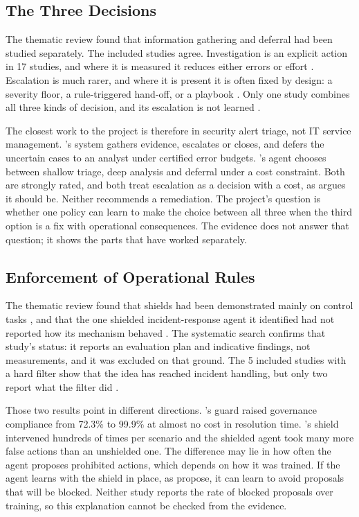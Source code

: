 \documentclass[pdflatex,sn-basic]{sn-jnl}
\begin{document}
\subsection{The Three Decisions}

The thematic review found that information gathering and deferral had been studied separately. The included studies agree. Investigation is an explicit action in 17 studies, and where it is measured it reduces either errors or effort \citep{wu2026,kovtun2026,ghanem2026,wang2023hrlhf}. Escalation is much rarer, and where it is present it is often fixed by design: a severity floor, a rule-triggered hand-off, or a playbook \citep{okafor2026,singh2026,koupaei2026}. Only one study combines all three kinds of decision, and its escalation is not learned \citep{okafor2026}.

The closest work to the project is therefore in security alert triage, not IT service management. \citeauthor{sahin2026}'s \citeyearpar{sahin2026} system gathers evidence, escalates or closes, and defers the uncertain cases to an analyst under certified error budgets. \citeauthor{kovtun2026}'s \citeyearpar{kovtun2026} agent chooses between shallow triage, deep analysis and deferral under a cost constraint. Both are strongly rated, and both treat escalation as a decision with a cost, as \citet{turan2026} argues it should be. Neither recommends a remediation. The project's question is whether one policy can learn to make the choice between all three when the third option is a fix with operational consequences. The evidence does not answer that question; it shows the parts that have worked separately.

\subsection{Enforcement of Operational Rules}

The thematic review found that shields had been demonstrated mainly on control tasks \citep{alshiekh2018,konighofer2025}, and that the one shielded incident-response agent it identified had not reported how its mechanism behaved \citep{alauthman2026}. The systematic search confirms that study's status: it reports an evaluation plan and indicative findings, not measurements, and it was excluded on that ground. The 5 included studies with a hard filter show that the idea has reached incident handling, but only two report what the filter did \citep{ravi2025,singh2026}.

Those two results point in different directions. \citeauthor{singh2026}'s \citeyearpar{singh2026} guard raised governance compliance from 72.3\% to 99.9\% at almost no cost in resolution time. \citeauthor{ravi2025}'s \citeyearpar{ravi2025} shield intervened hundreds of times per scenario and the shielded agent took many more false actions than an unshielded one. The difference may lie in how often the agent proposes prohibited actions, which depends on how it was trained. If the agent learns with the shield in place, as \citet{alshiekh2018} propose, it can learn to avoid proposals that will be blocked. Neither study reports the rate of blocked proposals over training, so this explanation cannot be checked from the evidence.
\end{document}
